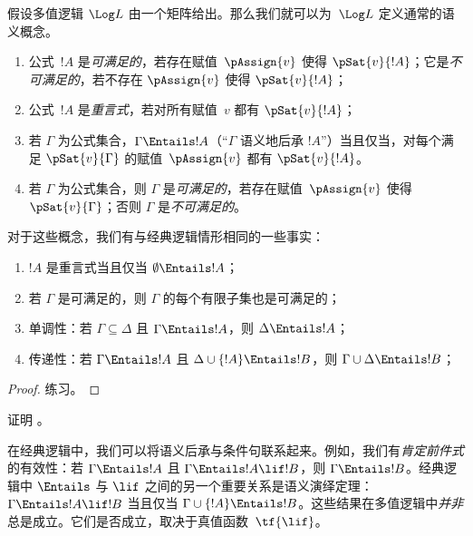 \documentclass[../../../include/open-logic-section]{subfiles}
\begin{document}


假设多值逻辑 $\Log L$ 由一个矩阵给出。那么我们就可以为~$\Log L$ 定义通常的语义概念。

\begin{defn}
\begin{enumerate}
\item 公式~$!A$ 是\emph{可满足的}，若存在赋值~$\pAssign{v}$ 使得 $\pSat{v}{!A}$；它是\emph{不可满足的}，若不存在 $\pAssign{v}$ 使得 $\pSat{v}{!A}$；
\item 公式~$!A$ 是\emph{重言式}，若对所有赋值~$v$ 都有 $\pSat{v}{!A}$；
\item 若 $\Gamma$ 为公式集合，$\Gamma \Entails !A$（“$\Gamma$ 语义地后承 $!A$”）当且仅当，对每个满足 $\pSat{v}{\Gamma}$ 的赋值~$\pAssign{v}$ 都有 $\pSat{v}{!A}$。
\item 若 $\Gamma$ 为公式集合，则 $\Gamma$ 是\emph{可满足的}，若存在赋值~$\pAssign{v}$ 使得 $\pSat{v}{\Gamma}$；否则 $\Gamma$ 是\emph{不可满足的}。
\end{enumerate}
\end{defn}

对于这些概念，我们有与经典逻辑情形相同的一些事实：

\begin{prop}
\begin{enumerate}
\item $!A$ 是重言式当且仅当 $\emptyset \Entails !A$；
\item 若 $\Gamma$ 是可满足的，则 $\Gamma$ 的每个有限子集也是可满足的；
\item{}单调性：若 $\Gamma \subseteq \Delta$ 且 $\Gamma \Entails !A$，则 $\Delta \Entails !A$；
\item{}传递性：若 $\Gamma \Entails !A$ 且 $\Delta \cup \{ !A\} \Entails !B$，则 $\Gamma \cup \Delta \Entails !B$；
\end{enumerate}
\end{prop}

\begin{proof}
练习。
\end{proof}

\begin{prob}
证明 。
\end{prob}

在经典逻辑中，我们可以将语义后承与条件句联系起来。例如，我们有\emph{肯定前件式}的有效性：若 $\Gamma \Entails !A$ 且 $\Gamma \Entails !A \lif !B$，则 $\Gamma \Entails !B$。经典逻辑中 $\Entails$ 与 $\lif$ 之间的另一个重要关系是语义演绎定理：$\Gamma \Entails !A \lif !B$ 当且仅当 $\Gamma \cup \{!A\} \Entails !B$。这些结果在多值逻辑中\emph{并非}总是成立。它们是否成立，取决于真值函数~$\tf{\lif}$。
\end{document}
